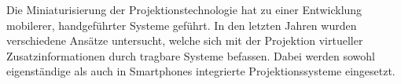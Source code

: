 

\prever{
}

\prever{
}

Die Miniaturisierung der Projektionstechnologie hat zu einer Entwicklung mobilerer, handgeführter Systeme geführt. In den letzten Jahren wurden verschiedene Ansätze untersucht, welche sich mit der Projektion virtueller Zusatzinformationen durch tragbare Systeme befassen. Dabei werden sowohl eigenständige als auch in Smartphones integrierte Projektionssysteme eingesetzt.\\

\prever{
}

